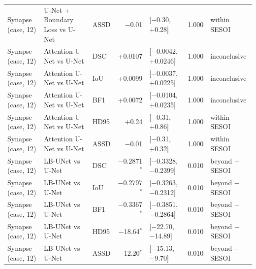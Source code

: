 \begin{tabular}{lllrlll}
Synapse (case, 12) & U-Net + Boundary Loss vs U-Net & ASSD & $-$0.01 & [$-$0.30, +0.28] & 1.000 & within SESOI \\
Synapse (case, 12) & Attention U-Net vs U-Net & DSC & +0.0107 & [$-$0.0042, +0.0246] & 1.000 & inconclusive \\
Synapse (case, 12) & Attention U-Net vs U-Net & IoU & +0.0099 & [$-$0.0037, +0.0225] & 1.000 & inconclusive \\
Synapse (case, 12) & Attention U-Net vs U-Net & BF1 & +0.0072 & [$-$0.0104, +0.0235] & 1.000 & inconclusive \\
Synapse (case, 12) & Attention U-Net vs U-Net & HD95 & +0.24 & [$-$0.31, +0.86] & 1.000 & within SESOI \\
Synapse (case, 12) & Attention U-Net vs U-Net & ASSD & $-$0.01 & [$-$0.31, +0.32] & 1.000 & within SESOI \\
Synapse (case, 12) & LB-UNet vs U-Net & DSC & $-$0.2871$^{*}$ & [$-$0.3328, $-$0.2399] & 0.010 & beyond $-$SESOI \\
Synapse (case, 12) & LB-UNet vs U-Net & IoU & $-$0.2797$^{*}$ & [$-$0.3263, $-$0.2312] & 0.010 & beyond $-$SESOI \\
Synapse (case, 12) & LB-UNet vs U-Net & BF1 & $-$0.3367$^{*}$ & [$-$0.3851, $-$0.2864] & 0.010 & beyond $-$SESOI \\
Synapse (case, 12) & LB-UNet vs U-Net & HD95 & $-$18.64$^{*}$ & [$-$22.70, $-$14.89] & 0.010 & beyond $-$SESOI \\
Synapse (case, 12) & LB-UNet vs U-Net & ASSD & $-$12.20$^{*}$ & [$-$15.13, $-$9.70] & 0.010 & beyond $-$SESOI \\
\bottomrule
\end{tabular}
